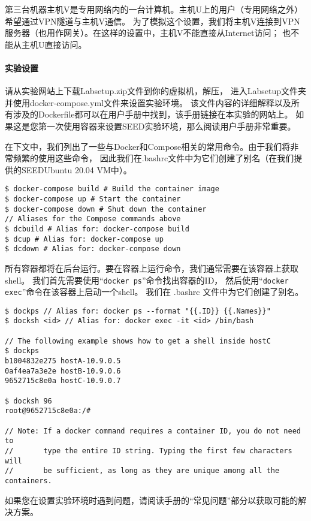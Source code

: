 第三台机器主机V是专用网络内的一台计算机。主机U上的用户（专用网络之外）希望通过VPN隧道与主机V通信。
为了模拟这个设置，我们将主机V连接到VPN服务器（也用作网关）。在这样的设置中，主机V不能直接从Internet访问；
也不能从主机U直接访问。


\paragraph{实验设置}
请从实验网站上下载Labsetup.zip文件到你的虚拟机，解压，
进入Labsetup文件夹并使用docker-compose.yml文件来设置实验环境。
该文件内容的详细解释以及所有涉及的Dockerfile都可以在用户手册中找到，该手册链接在本实验的网站上。
如果这是您第一次使用容器来设置SEED实验环境，那么阅读用户手册非常重要。


在下文中，我们列出了一些与Docker和Compose相关的常用命令。由于我们将非常频繁的使用这些命令，
因此我们在.bashrc文件中为它们创建了别名（在我们提供的SEEDUbuntu 20.04 VM中）。

\begin{lstlisting}
$ docker-compose build # Build the container image
$ docker-compose up # Start the container
$ docker-compose down # Shut down the container
// Aliases for the Compose commands above
$ dcbuild # Alias for: docker-compose build
$ dcup # Alias for: docker-compose up
$ dcdown # Alias for: docker-compose down
\end{lstlisting}

所有容器都将在后台运行。要在容器上运行命令，我们通常需要在该容器上获取shell。
我们首先需要使用“\verb|docker ps|”命令找出容器的ID，
然后使用“\verb|docker exec|”命令在该容器上启动一个shell。
我们在 .bashrc 文件中为它们创建了别名。

\begin{lstlisting}
$ dockps // Alias for: docker ps --format "{{.ID}} {{.Names}}"
$ docksh <id> // Alias for: docker exec -it <id> /bin/bash

// The following example shows how to get a shell inside hostC
$ dockps
b1004832e275 hostA-10.9.0.5
0af4ea7a3e2e hostB-10.9.0.6
9652715c8e0a hostC-10.9.0.7

$ docksh 96
root@9652715c8e0a:/#

// Note: If a docker command requires a container ID, you do not need to
//       type the entire ID string. Typing the first few characters will
//       be sufficient, as long as they are unique among all the containers.
\end{lstlisting}

如果您在设置实验环境时遇到问题，请阅读手册的“常见问题”部分以获取可能的解决方案。


